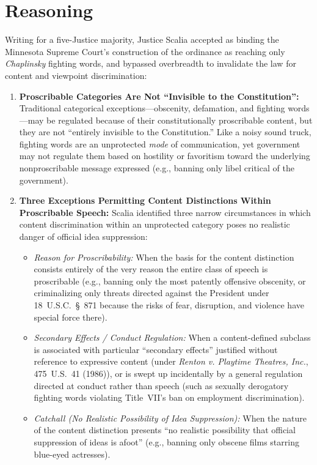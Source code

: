 \documentclass[12pt]{article}
\begin{document}
\section{Reasoning}
Writing for a five-Justice majority, Justice Scalia accepted as binding the Minnesota Supreme Court's construction of the ordinance as reaching only \textit{Chaplinsky} fighting words, and bypassed overbreadth to invalidate the law for content and viewpoint discrimination:
\begin{enumerate}
  \item \textbf{Proscribable Categories Are Not ``Invisible to the Constitution'':} Traditional categorical exceptions---obscenity, defamation, and fighting words---may be regulated because of their constitutionally proscribable content, but they are not ``entirely invisible to the Constitution.'' Like a noisy sound truck, fighting words are an unprotected \textit{mode} of communication, yet government may not regulate them based on hostility or favoritism toward the underlying nonproscribable message expressed (e.g., banning only libel critical of the government).
  \item \textbf{Three Exceptions Permitting Content Distinctions Within Proscribable Speech:} Scalia identified three narrow circumstances in which content discrimination within an unprotected category poses no realistic danger of official idea suppression:
  \begin{itemize}
    \item \textit{Reason for Proscribability:} When the basis for the content distinction consists entirely of the very reason the entire class of speech is proscribable (e.g., banning only the most patently offensive obscenity, or criminalizing only threats directed against the President under 18~U.S.C.~\S~871 because the risks of fear, disruption, and violence have special force there).
    \item \textit{Secondary Effects / Conduct Regulation:} When a content-defined subclass is associated with particular ``secondary effects'' justified without reference to expressive content (under \textit{Renton v. Playtime Theatres, Inc.}, 475~U.S.~41 (1986)), or is swept up incidentally by a general regulation directed at conduct rather than speech (such as sexually derogatory fighting words violating Title~VII's ban on employment discrimination).
    \item \textit{Catchall (No Realistic Possibility of Idea Suppression):} When the nature of the content distinction presents ``no realistic possibility that official suppression of ideas is afoot'' (e.g., banning only obscene films starring blue-eyed actresses).

\end{itemize}
\end{enumerate}
\end{document}
